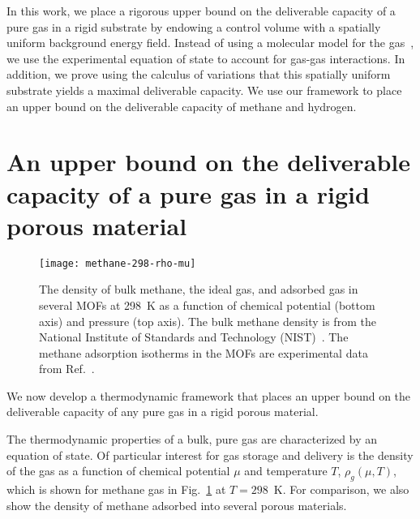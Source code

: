 
In this work, we place a rigorous upper bound on the deliverable capacity of a pure gas in a rigid substrate by endowing a control volume with a spatially uniform background energy field. Instead of using a molecular model for the gas~\cite{gomez2017impact}, we use the experimental equation of state to account for gas-gas interactions. In addition, we prove using the calculus of variations that this spatially uniform substrate yields a maximal deliverable capacity. We use our framework to place an upper bound on the deliverable capacity of methane and hydrogen.

\section{An upper bound on the deliverable capacity of a pure gas in a rigid porous material}\label{sec:upper-bound}
\begin{figure}
  \centering
  \texttt{[image: methane-298-rho-mu]}
  \caption{The density of bulk methane, the ideal gas, and adsorbed gas in several MOFs at 298\ K as a function of chemical potential (bottom axis) and pressure (top axis). The bulk methane density is from the National Institute of Standards and Technology (NIST)~\cite{nist}. The methane adsorption isotherms in the MOFs are experimental data from Ref.~\cite{mason2014evaluating, furukawa2009storage}.
  }
  \label{fig:density-vs-mu-ch4}
\end{figure}

We now develop a thermodynamic framework that places an upper bound on the deliverable capacity of any pure gas in a rigid porous material.

The thermodynamic properties of a bulk, pure gas are characterized by an equation of state. 
Of particular interest for gas storage and delivery is the density of the gas as a function of chemical potential $\mu$ and temperature $T$, $\rho_g(\mu,T)$, which is shown for methane gas in Fig.~\ref{fig:density-vs-mu-ch4} at $T=298$\ K. For comparison, we also show the density of methane adsorbed into several porous materials.


